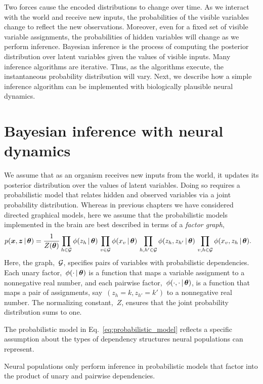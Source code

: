 Two forces cause the encoded distributions to change over time. As
we interact with the world and receive new inputs, the probabilities
of the visible variables change to reflect the new
observations. Moreover, even for a fixed set of visible variable
assignments, the probabilities of hidden variables will change as we
perform inference. Bayesian inference is the process of computing the
posterior distribution over latent variables given the values of visible
inputs. Many inference algorithms are iterative. Thus, as the
algorithms execute, the instantaneous probability distribution will
vary. Next, we describe how a simple inference algorithm can be
implemented with biologically plausible neural dynamics.

\section{Bayesian inference with neural dynamics}
We assume that as an organism receives new inputs from the world, it
updates its posterior distribution over the values of latent
variables. Doing so requires a probabilistic model that relates hidden
and observed variables via a joint probability distribution.  Whereas
in previous chapters we have considered directed graphical models,
here we assume that the probabilistic models implemented in the brain
are best described in terms of a \emph{factor graph},
\begin{align}
  \label{eq:probabilistic_model}
  p(\boldsymbol{x}, \boldsymbol{z} \,|\, \boldsymbol{\theta}) &=
  \frac{1}{Z(\boldsymbol{\theta})}
  \prod_{h \in \mathcal{G}} \phi(z_h \,|\, \boldsymbol{\theta}) \,
  \prod_{v \in \mathcal{G}} \phi(x_v \,|\, \boldsymbol{\theta}) \,
  \prod_{h,h' \in \mathcal{G}} \phi(z_h, z_{h'} \,|\, \boldsymbol{\theta}) \,
  \prod_{v,h \in \mathcal{G}} \phi(x_v, z_{h} \,|\, \boldsymbol{\theta}).
\end{align}
Here, the graph,~$\mathcal{G}$, specifies pairs of variables with
probabilistic dependencies.  Each unary factor,~$\phi(\cdot \,|\,
\boldsymbol{\theta})$ is a function that maps a variable assignment to a
nonnegative real number, and each pairwise factor,~$\phi(\cdot, \cdot
\,|\, \boldsymbol{\theta})$, is a function that maps a pair of assignments,
say~${(z_h=k, z_{h'}=k')}$ to a nonnegative real number. The
normalizing constant,~$Z$, ensures that the joint probability
distribution sums to one.

The probabilistic model in Eq.~\ref{eq:probabilistic_model} reflects
a specific assumption about the types of dependency structures
neural populations can represent.

\begin{assumption}
  Neural populations only perform inference in probabilistic models
  that factor into the product of unary and pairwise dependencies. 
\end{assumption}

